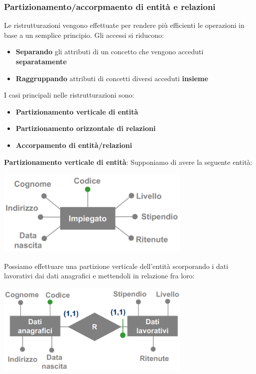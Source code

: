 \documentclass[12pt]{article}
\begin{document}
\subsubsection{Partizionamento/accorpmaento di entità e relazioni}
Le ristrutturazioni vengono effettuate per rendere più efficienti le operazioni in base a un semplice principio.
Gli accessi si riducono:
\begin{itemize}
    \item \textbf{Separando} gli attributi di un concetto che vengono acceduti \textbf{separatamente}
    \item \textbf{Raggruppando} attributi di concetti diversi acceduti \textbf{insieme}
\end{itemize}
I casi principali nelle ristrutturazioni sono:
\begin{itemize}
    \item \textbf{Partizionamento verticale di entità}
    \item \textbf{Partizionamento orizzontale di relazioni}
    \item \textbf{Accorpamento di entità/relazioni}
\end{itemize}
\textbf{Partizionamento verticale di entità}:
Supponiamo di avere la seguente entità:
\begin{center}
    \includegraphics[width = 0.70\textwidth]{Images/105.PNG}
\end{center}
Possiamo effettuare una partizione verticale dell'entità scorporando i dati lavorativi dai dati anagrafici e mettendoli in relazione fra loro:
\begin{center}
    \includegraphics[width = 0.70\textwidth]{Images/106.PNG}
\end{center}
\end{document}
